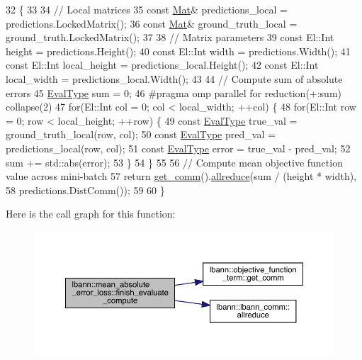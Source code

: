\begin{DoxyCode}
32                                                                  \{
33 
34   \textcolor{comment}{// Local matrices}
35   \textcolor{keyword}{const} \hyperlink{base_8hpp_a68f11fdc31b62516cb310831bbe54d73}{Mat}& predictions\_local = predictions.LockedMatrix();
36   \textcolor{keyword}{const} \hyperlink{base_8hpp_a68f11fdc31b62516cb310831bbe54d73}{Mat}& ground\_truth\_local = ground\_truth.LockedMatrix();
37 
38   \textcolor{comment}{// Matrix parameters}
39   \textcolor{keyword}{const} El::Int height = predictions.Height();
40   \textcolor{keyword}{const} El::Int width = predictions.Width();
41   \textcolor{keyword}{const} El::Int local\_height = predictions\_local.Height();
42   \textcolor{keyword}{const} El::Int local\_width = predictions\_local.Width();
43 
44   \textcolor{comment}{// Compute sum of absolute errors}
45   \hyperlink{base_8hpp_a3266f5ac18504bbadea983c109566867}{EvalType} sum = 0;
46 \textcolor{preprocessor}{  #pragma omp parallel for reduction(+:sum) collapse(2)}
47   \textcolor{keywordflow}{for}(El::Int col = 0; col < local\_width; ++col) \{
48     \textcolor{keywordflow}{for}(El::Int row = 0; row < local\_height; ++row) \{
49       \textcolor{keyword}{const} \hyperlink{base_8hpp_a3266f5ac18504bbadea983c109566867}{EvalType} true\_val = ground\_truth\_local(row, col);
50       \textcolor{keyword}{const} \hyperlink{base_8hpp_a3266f5ac18504bbadea983c109566867}{EvalType} pred\_val = predictions\_local(row, col);
51       \textcolor{keyword}{const} \hyperlink{base_8hpp_a3266f5ac18504bbadea983c109566867}{EvalType} error = true\_val - pred\_val;
52       sum += std::abs(error);
53     \}
54   \}
55 
56   \textcolor{comment}{// Compute mean objective function value across mini-batch}
57   \textcolor{keywordflow}{return} \hyperlink{classlbann_1_1objective__function__term_a5f89b676a26a6b76ddc26563ac87beb9}{get\_comm}().\hyperlink{classlbann_1_1lbann__comm_af5631e5f0f54e4df4958eba9df2599ef}{allreduce}(sum / (height * width),
58                               predictions.DistComm());
59 
60 \}
\end{DoxyCode}
Here is the call graph for this function\+:\nopagebreak
\begin{figure}[H]
\begin{center}
\leavevmode
\includegraphics[width=350pt]{classlbann_1_1mean__absolute__error__loss_a0b6518199e86abc197e811f0a1ff7868_cgraph}
\end{center}
\end{figure}
